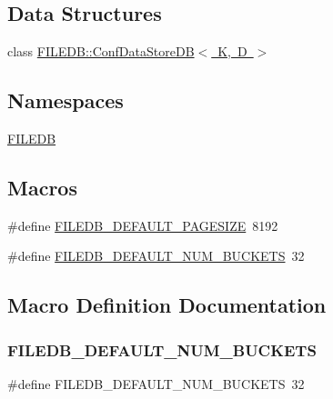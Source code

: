 \subsection*{Data Structures}
\begin{DoxyCompactItemize}
\item 
class \mbox{\hyperlink{classFILEDB_1_1ConfDataStoreDB}{F\+I\+L\+E\+D\+B\+::\+Conf\+Data\+Store\+D\+B$<$ K, D $>$}}
\end{DoxyCompactItemize}
\subsection*{Namespaces}
\begin{DoxyCompactItemize}
\item 
 \mbox{\hyperlink{namespaceFILEDB}{F\+I\+L\+E\+DB}}
\end{DoxyCompactItemize}
\subsection*{Macros}
\begin{DoxyCompactItemize}
\item 
\#define \mbox{\hyperlink{adat-devel_2other__libs_2filedb_2src_2ConfDataStoreDB_8h_a1018d48e4d99c8fa0b584d70ae882b65}{F\+I\+L\+E\+D\+B\+\_\+\+D\+E\+F\+A\+U\+L\+T\+\_\+\+P\+A\+G\+E\+S\+I\+ZE}}~8192
\item 
\#define \mbox{\hyperlink{adat-devel_2other__libs_2filedb_2src_2ConfDataStoreDB_8h_a3dcf134f589b0ae975929bbc209a010f}{F\+I\+L\+E\+D\+B\+\_\+\+D\+E\+F\+A\+U\+L\+T\+\_\+\+N\+U\+M\+\_\+\+B\+U\+C\+K\+E\+TS}}~32
\end{DoxyCompactItemize}


\subsection{Macro Definition Documentation}
\mbox{\label{adat-devel_2other__libs_2filedb_2src_2ConfDataStoreDB_8h_a3dcf134f589b0ae975929bbc209a010f}} 
\subsubsection{\texorpdfstring{FILEDB\_DEFAULT\_NUM\_BUCKETS}{FILEDB\_DEFAULT\_NUM\_BUCKETS}}
{\footnotesize\ttfamily \#define F\+I\+L\+E\+D\+B\+\_\+\+D\+E\+F\+A\+U\+L\+T\+\_\+\+N\+U\+M\+\_\+\+B\+U\+C\+K\+E\+TS~32}

